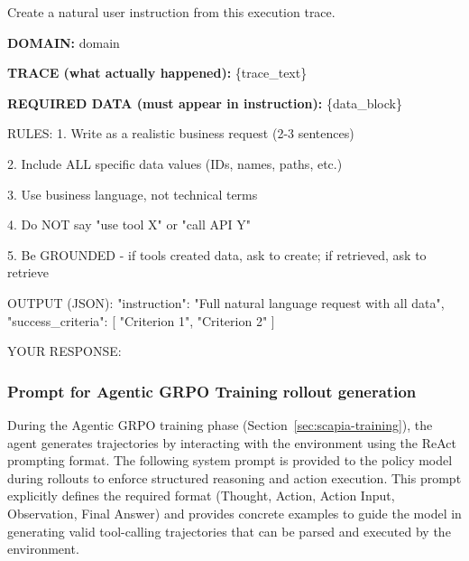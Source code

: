 \documentclass{article}
\theoremstyle{plain}
\theoremstyle{definition}
\theoremstyle{remark}
\begin{document}
\begin{tcolorbox}[
    enhanced,
    breakable,
    width=\linewidth,
    title=Prompt for High Level Task Generation,
    fonttitle=\bfseries\normalsize,  %
    colframe=blue!75!black,
    colback=white!10!white,
    coltitle=white,
    colbacktitle=blue!85!black,
    boxrule=0.2mm,
    sharp corners,
    shadow={1mm}{-1mm}{0mm}{black!50!white},
    attach boxed title to top left={yshift=-2mm, xshift=3mm},  %
    boxed title style={sharp corners, size=small},
    top=3mm,  %
    bottom=2mm  %
]

\small
\ttfamily %
\setlength{\parindent}{0pt} %
\setlength{\parskip}{0.5em} %

Create a natural user instruction from this execution trace.

\textbf{DOMAIN:} {domain}

\textbf{TRACE (what actually happened):}
\{trace\_text\}

\textbf{REQUIRED DATA (must appear in instruction):}
\{data\_block\}

RULES:
1. Write as a realistic business request (2-3 sentences)

2. Include ALL specific data values (IDs, names, paths, etc.)

3. Use business language, not technical terms

4. Do NOT say "use tool X" or "call API Y"

5. Be GROUNDED - if tools created data, ask to create; if retrieved, ask to retrieve

OUTPUT (JSON):
{{
  "instruction": "Full natural language request with all data",
  "success\_criteria": [
    "Criterion 1",
    "Criterion 2"
  ]
}}

YOUR RESPONSE: 
\end{tcolorbox}
\subsubsection{Prompt for Agentic GRPO Training rollout generation}
\label{app:agrpo_prompt}

During the Agentic GRPO training phase (Section~\ref{sec:scapia-training}), the agent generates trajectories by interacting with the environment using the ReAct prompting format. The following system prompt is provided to the policy model during rollouts to enforce structured reasoning and action execution. This prompt explicitly defines the required format (Thought, Action, Action Input, Observation, Final Answer) and provides concrete examples to guide the model in generating valid tool-calling trajectories that can be parsed and executed by the environment.
\end{document}
